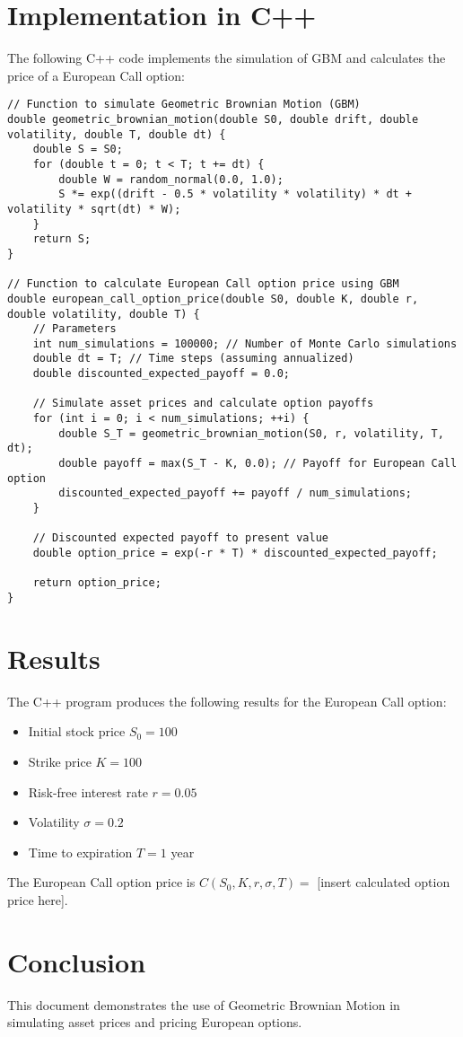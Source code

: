 \documentclass{article}
\begin{document}
\section{Implementation in C++}

The following C++ code implements the simulation of GBM and calculates the price of a European Call option:

\begin{verbatim}
// Function to simulate Geometric Brownian Motion (GBM)
double geometric_brownian_motion(double S0, double drift, double volatility, double T, double dt) {
    double S = S0;
    for (double t = 0; t < T; t += dt) {
        double W = random_normal(0.0, 1.0);
        S *= exp((drift - 0.5 * volatility * volatility) * dt + volatility * sqrt(dt) * W);
    }
    return S;
}

// Function to calculate European Call option price using GBM
double european_call_option_price(double S0, double K, double r, double volatility, double T) {
    // Parameters
    int num_simulations = 100000; // Number of Monte Carlo simulations
    double dt = T; // Time steps (assuming annualized)
    double discounted_expected_payoff = 0.0;

    // Simulate asset prices and calculate option payoffs
    for (int i = 0; i < num_simulations; ++i) {
        double S_T = geometric_brownian_motion(S0, r, volatility, T, dt);
        double payoff = max(S_T - K, 0.0); // Payoff for European Call option
        discounted_expected_payoff += payoff / num_simulations;
    }

    // Discounted expected payoff to present value
    double option_price = exp(-r * T) * discounted_expected_payoff;

    return option_price;
}\end{verbatim}

\section{Results}

The C++ program produces the following results for the European Call option:

\begin{itemize}
    \item Initial stock price \( S_0 = 100 \)
    \item Strike price \( K = 100 \)
    \item Risk-free interest rate \( r = 0.05 \)
    \item Volatility \( \sigma = 0.2 \)
    \item Time to expiration \( T = 1 \) year
\end{itemize}

The European Call option price is \( C(S_0, K, r, \sigma, T) = \) [insert calculated option price here].

\section{Conclusion}

This document demonstrates the use of Geometric Brownian Motion in simulating asset prices and pricing European options.
\end{document}
